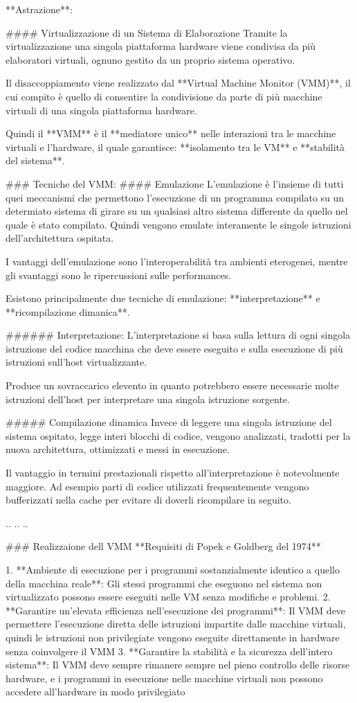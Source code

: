 \documentclass[a4paper, 11pt, twoside, openright]{book}
\begin{document}
**Astrazione**: 

#### Virtualizzazione di un Sistema di Elaborazione
Tramite la virtualizzazione una singola piattaforma hardware viene condivisa da più elaboratori 
virtuali, ognuno gestito da un proprio sistema operativo.

Il disaccoppiamento viene realizzato dal **Virtual Machine Monitor (VMM)**, il cui compito
è quello di consentire la condivisione da parte di più macchine virtuali di una singola
piattaforma hardware.

Quindi il **VMM** è il **mediatore unico** nelle interazioni tra le macchine virtuali e
l'hardware, il quale garantisce: **isolamento tra le VM** e **stabilità del sistema**.


### Tecniche del VMM:
#### Emulazione
L'emulazione è l'insieme di tutti quei meccanismi che permettono l'esecuzione di un programma
compilato su un determiato sistema di girare su un qualsiasi altro sistema differente da quello
nel quale è stato compilato.
Quindi vengono emulate interamente le singole istruzioni dell'architettura ospitata.

I vantaggi dell'emulazione sono l'interoperabilità tra ambienti eterogenei, mentre gli svantaggi sono
le ripercussioni sulle performances.

Esistono principalmente due tecniche di emulazione: **interpretazione** e **ricompilazione dimanica**.

###### Interpretazione:
L'interpretazione si basa sulla lettura di ogni singola istruzione del codice macchina che deve
essere eseguito e sulla esecuzione di più istruzioni sull'host virtualizzante.

Produce un sovraccarico elevento in quanto potrebbero essere necessarie molte istruzioni dell'host
per interpretare una singola istruzione sorgente.

##### Compilazione dinamica
Invece di leggere una singola istruzione del sistema ospitato, legge interi blocchi di codice,
vengono analizzati, tradotti per la nuova architettura, ottimizzati e messi in esecuzione.

Il vantaggio in termini prestazionali rispetto all'interpretazione è notevolmente maggiore.
Ad esempio parti di codice utilizzati frequentemente vengono bufferizzati nella cache per evitare
di doverli ricompilare in seguito.


..
..
..

### Realizzaione dell VMM
**Requisiti di Popek e Goldberg del 1974**

1. **Ambiente di esecuzione per i programmi sostanzialmente identico a quello della macchina reale**:
    Gli stessi programmi che eseguono nel sistema non virtualizzato possono essere eseguiti nelle VM
    senza modifiche e problemi.
2. **Garantire un'elevata efficienza nell'esecuzione dei programmi**:
    Il VMM deve permettere l'esecuzione diretta delle istruzioni impartite dalle macchine virtuali, quindi
    le istruzioni non privilegiate vengono eseguite direttamente in hardware senza coinvolgere il VMM
3. **Garantire la stabilità e la sicurezza dell'intero sistema**:
    Il VMM deve sempre rimanere sempre nel pieno controllo delle risorse hardware, e i programmi in 
    esecuzione nelle macchine virtuali non possono accedere all'hardware in modo privilegiato
\end{document}
